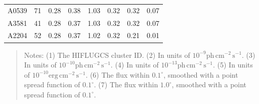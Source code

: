 \documentclass[10pt,aps,pra,reprint,amsmath,amsfonts,amssymb,showpacs,nofootinbib,floatfix]{revtex4-1}
\newcommand{\rmn}{\mathrm}
\begin{document}
\begin{table}
\begin{minipage}{2.0\columnwidth}
\begin{tabular}{l c c c c c c c}
A0539 & 71 & 0.28 & 0.38 & 1.03 & 0.32 & 0.32 & 0.07 \\
A3581 & 41 & 0.28 & 0.37 & 1.03 & 0.32 & 0.32 & 0.07 \\
A2204 & 52 & 0.28 & 0.37 & 1.02 & 0.32 & 0.21 & 0.01 \\
\hline
\hline
\end{tabular}
\begin{quote}
  Notes:
   (1) The HIFLUGCS cluster ID.
   (2) In units of $10^{-9} \rmn{ph}\,\rmn{cm}^{-2}\,\rmn{s}^{-1}$.
   (3) In units of $10^{-10} \rmn{ph}\,\rmn{cm}^{-2}\,\rmn{s}^{-1}$.
   (4) In units of $10^{-13} \rmn{ph}\,\rmn{cm}^{-2}\,\rmn{s}^{-1}$.
   (5) In units of $10^{-10} \rmn{erg}\,\rmn{cm}^{-2}\,\rmn{s}^{-1}$.
   (6) The flux within $0.1^\circ$, smoothed with a point spread function of $0.1^\circ$.
   (7) The flux within $1.0^\circ$, smoothed with a point spread function of $0.1^\circ$.
 \label{tab:flux_tab_CRs}
  \end{quote}
\end{minipage}
\end{table}
\end{document}
